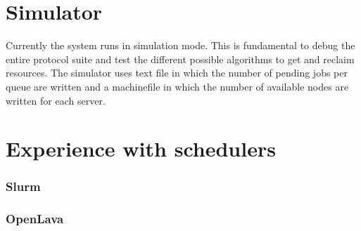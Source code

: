 \documentclass{report}
\begin{document}
\chapter{Simulator}

Currently the system runs in simulation mode. This is fundamental to debug the entire protocol suite and test the different possible algorithms to get and reclaim resources. The simulator uses text file in which the number of pending jobs per queue are written and a machinefile in which the number of available nodes are written for each server.

\chapter{Experience with schedulers}

\subsection{Slurm}

\subsection{OpenLava}

\end{document}
